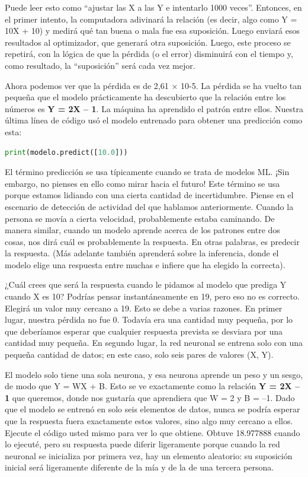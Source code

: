 Puede leer esto como ``ajustar las X a las Y e intentarlo 1000 veces''. Entonces, en el primer intento, la computadora adivinará la relación (es decir, algo como Y = 10X + 10) y medirá qué tan buena o mala fue esa suposición. Luego enviará esos resultados al optimizador, que generará otra suposición. Luego, este proceso se repetirá, con la lógica de que la pérdida (o el error) disminuirá con el tiempo y, como resultado, la ``suposición'' será cada vez mejor.

Ahora podemos ver que la pérdida es de 2,61 × 10-5. La pérdida se ha vuelto tan pequeña que el modelo prácticamente ha descubierto que la relación entre los números es \textbf{Y = 2X – 1}. La máquina ha aprendido el patrón entre ellos. Nuestra última línea de código usó el modelo entrenado para obtener una predicción como esta:

\begin{lstlisting}[language=python]
print(modelo.predict([10.0]))
\end{lstlisting}

El término predicción se usa típicamente cuando se trata de modelos ML. ¡Sin embargo, no pienses en ello como mirar hacia el futuro! Este término se usa porque estamos lidiando con una cierta cantidad de incertidumbre. Piense en el escenario de detección de actividad del que hablamos anteriormente. Cuando la persona se movía a cierta velocidad, probablemente estaba caminando. De manera similar, cuando un modelo aprende acerca de los patrones entre dos cosas, nos dirá cuál es probablemente la respuesta. En otras palabras, es predecir la respuesta. (Más adelante también aprenderá sobre la inferencia, donde el modelo elige una respuesta entre muchas e infiere que ha elegido la correcta).

¿Cuál crees que será la respuesta cuando le pidamos al modelo que prediga Y cuando X es 10? Podrías pensar instantáneamente en 19, pero eso no es correcto. Elegirá un valor muy cercano a 19. Esto se debe a varias razones. En primer lugar, nuestra pérdida no fue 0. Todavía era una cantidad muy pequeña, por lo que deberíamos esperar que cualquier respuesta prevista se desviara por una cantidad muy pequeña. En segundo lugar, la red neuronal se entrena solo con una pequeña cantidad de datos; en este caso, solo seis pares de valores (X, Y).

El modelo solo tiene una sola neurona, y esa neurona aprende un peso y un sesgo, de modo que Y = WX + B. Esto se ve exactamente como la relación \textbf{Y = 2X – 1} que queremos, donde nos gustaría que aprendiera que W = 2 y B = –1. Dado que el modelo se entrenó en solo seis elementos de datos, nunca se podría esperar que la respuesta fuera exactamente estos valores, sino algo muy cercano a ellos. Ejecute el código usted mismo para ver lo que obtiene. Obtuve 18.977888 cuando lo ejecuté, pero su respuesta puede diferir ligeramente porque cuando la red neuronal se inicializa por primera vez, hay un elemento aleatorio: su suposición inicial será ligeramente diferente de la mía y de la de una tercera persona.

